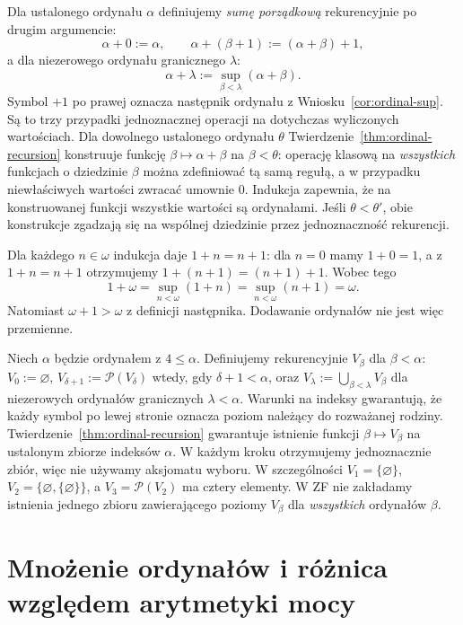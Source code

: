 \begin{przyklad}\label{ex:ordinal-addition}
Dla ustalonego ordynału $\alpha$ definiujemy
\emph{sumę porządkową} rekurencyjnie
po drugim argumencie:
\[
\alpha+0:=\alpha,\qquad
\alpha+(\beta+1):=(\alpha+\beta)+1,
\]
a dla niezerowego ordynału granicznego $\lambda$:
\[
\alpha+\lambda:=\sup_{\beta<\lambda}(\alpha+\beta).
\]
Symbol $+1$ po prawej oznacza następnik ordynału
z Wniosku~\ref{cor:ordinal-sup}.
Są to trzy przypadki jednoznacznej operacji
na dotychczas wyliczonych wartościach.
Dla dowolnego ustalonego ordynału $\theta$
Twierdzenie~\ref{thm:ordinal-recursion}
konstruuje funkcję $\beta\mapsto\alpha+\beta$
na $\beta<\theta$:
operację klasową na \emph{wszystkich}
funkcjach o dziedzinie $\beta$
można zdefiniować tą samą regułą,
a w przypadku niewłaściwych wartości
zwracać umownie $0$.
Indukcja zapewnia, że na konstruowanej funkcji
wszystkie wartości są ordynałami.
Jeśli $\theta<\theta'$, obie konstrukcje
zgadzają się na wspólnej dziedzinie
przez jednoznaczność rekurencji.

Dla każdego $n\in\omega$ indukcja
daje $1+n=n+1$:
dla $n=0$ mamy $1+0=1$,
a z $1+n=n+1$ otrzymujemy
$1+(n+1)=(n+1)+1$.
Wobec tego
\[
1+\omega=\sup_{n<\omega}(1+n)
=\sup_{n<\omega}(n+1)=\omega.
\]
Natomiast $\omega+1>\omega$
z definicji następnika.
Dodawanie ordynałów nie jest więc przemienne.
\end{przyklad}


\begin{przyklad}
\label{ex:ordinal-vn-hierarchy}
Niech $\alpha$ będzie ordynałem z $4\le\alpha$.
Definiujemy rekurencyjnie $V_\beta$ dla $\beta<\alpha$:
$V_0:=\varnothing$,
$V_{\delta+1}:=\mathcal P(V_\delta)$
wtedy, gdy $\delta+1<\alpha$,
oraz $V_\lambda:=\bigcup_{\beta<\lambda}V_\beta$
dla niezerowych ordynałów granicznych $\lambda<\alpha$.
Warunki na indeksy gwarantują, że
każdy symbol po lewej stronie oznacza
poziom należący do rozważanej rodziny.
Twierdzenie~\ref{thm:ordinal-recursion}
gwarantuje istnienie funkcji
$\beta\mapsto V_\beta$ na ustalonym zbiorze
indeksów $\alpha$.
W każdym kroku otrzymujemy jednoznacznie zbiór,
więc nie używamy aksjomatu wyboru.
W szczególności
$V_1=\{\varnothing\}$,
$V_2=\{\varnothing,\{\varnothing\}\}$,
a $V_3=\mathcal P(V_2)$ ma cztery elementy.
W ZF nie zakładamy istnienia jednego zbioru
zawierającego poziomy $V_\beta$ dla
\emph{wszystkich} ordynałów $\beta$.
\end{przyklad}

\section{Mnożenie ordynałów i różnica względem arytmetyki mocy}

